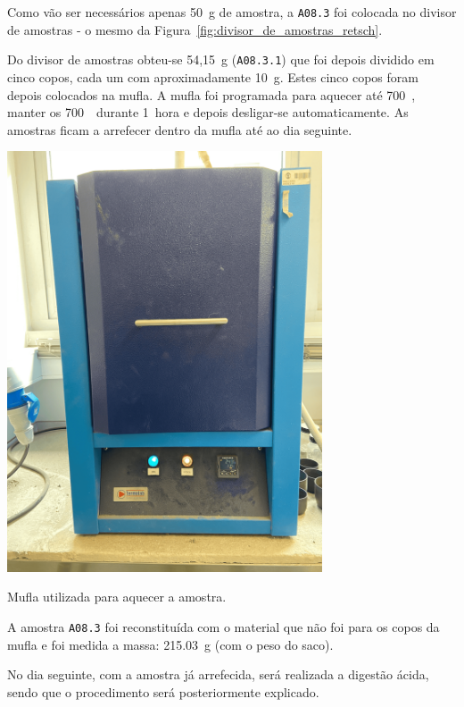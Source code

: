 Como vão ser necessários apenas 50~g de amostra, a \texttt{A08.3} foi colocada no divisor de amostras - o mesmo da Figura~\ref{fig:divisor_de_amostras_retsch}.

Do divisor de amostras obteu-se 54,15~g (\texttt{A08.3.1}) que foi depois dividido em cinco copos, cada um com aproximadamente 10~g.
Estes cinco copos foram depois colocados na mufla.
A mufla foi programada para aquecer até 700~\graus, manter os 700~\graus \, durante 1~hora e depois desligar-se automaticamente.
As amostras ficam a arrefecer dentro da mufla até ao dia seguinte.
\begin{marginfigure}[1\baselineskip]
    \centering
    \includegraphics[width=0.7\textwidth]{figures/Mufla}
    \caption{Mufla utilizada para aquecer a amostra.}
    \label{fig:mufla}
\end{marginfigure}

A amostra \texttt{A08.3} foi reconstituída com o material que não foi para os copos da mufla e foi medida a massa: 215.03~g (com o peso do saco).

No dia seguinte, com a amostra já arrefecida, será realizada a digestão ácida, sendo que o procedimento será posteriormente explicado.

\hrulefill


\label{day:8-novembro-2024}

